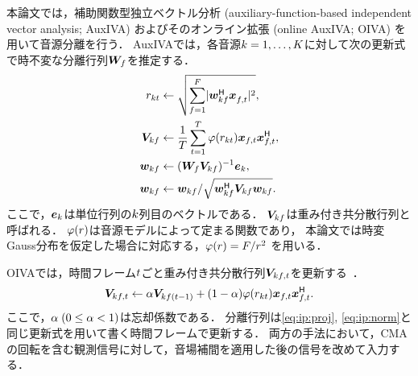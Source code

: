 \documentclass[twocolumn,9pt,dvipdfmx]{article}
\begin{document}
本論文では，補助関数型独立ベクトル分析 (auxiliary-function-based independent vector analysis; AuxIVA) \cite{Ono:2011:WASPAA}
およびそのオンライン拡張 (online AuxIVA; OIVA) \cite{Taniguchi:2014:HSCMA} を用いて音源分離を行う．
AuxIVAでは，各音源$k = 1, \dots, K$に対して次の更新式で時不変な分離行列$\bm{W} _{f}$を推定する．
\begin{align}
  \var _{\src\tframe} &\gets \sqrt{\sum _{\freq=1} ^{\Freq} \lvert \demix ^{\hermite} _{\src\freq} \Obs ^{\nohermite}_{\ft} \rvert ^2}, \\
  \cov _{\src\freq} &\gets \frac{1}{\Tframe} \sum _{\tframe=1} ^{\Tframe} \weight (\var_{\src\tframe}) \Obs _{\ft} \Obs _{\ft}^{\hermite}, \\
  \demix _{\src\freq} &\gets (\Demix _{\freq} \cov _{\src\freq}) ^{-1} \bm{e} _{\src} \label{eq:ip:proj}, \\
  \demix _{\src\freq} &\gets {\demix _{\src\freq}} / {\sqrt{\demix _{\src\freq} ^{\hermite} \cov _{\src\freq} \demix _{\src\freq}}} \label{eq:ip:norm}.
\end{align}
ここで，$\bm{e}_{k}$は単位行列の$k$列目のベクトルである．
$\bm{V} _{kf}$は{重み付き共分散行列}と呼ばれる．
$\varphi(r)$は音源モデルによって定まる関数であり，
本論文では時変Gauss分布を仮定した場合に対応する，$\varphi (r) = F/{r ^2}$ \cite{Ono:2012:APSIPA}を用いる．

OIVAでは，時間フレーム$t$ごと重み付き共分散行列$\cov _{\src\ft}$を更新する~\cite{Taniguchi:2014:HSCMA}．
\begin{equation}
  \cov _{\src\ft} \gets \forget \cov _{\src\freq(\tframe-1)} + (1 - \forget) \weight ({\var _{\src\tframe}}) \Obs _{\ft} \Obs _{\ft}^{\hermite}.
\end{equation}
ここで，$\alpha\; (0 \leq \alpha < 1)$は忘却係数である．
分離行列は\cref{eq:ip:proj}, \cref{eq:ip:norm}と同じ更新式を用いて書く時間フレームで更新する．
両方の手法において，CMAの回転を含む観測信号に対して，音場補間を適用した後の信号を改めて入力する．

\end{document}
